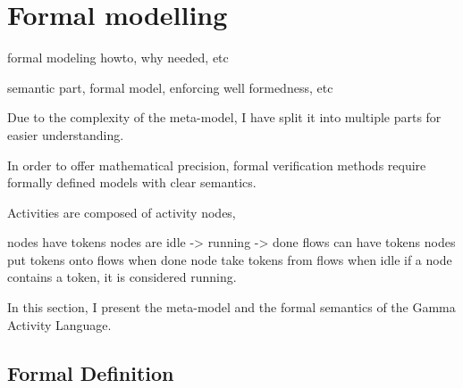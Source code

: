 \clearpage\section{Formal modelling}


formal modeling howto, why needed, etc

semantic part, formal model, enforcing well formedness, etc

Due to the complexity of the meta-model, I have split it into multiple parts for easier understanding.


In order to offer mathematical precision, formal verification methods require formally defined models with clear semantics. 

Activities are composed of activity nodes, 

nodes have tokens
nodes are idle -> running -> done
flows can have tokens
nodes put tokens onto flows when done
node take tokens from flows when idle
if a node contains a token, it is considered running.

In this section, I present the meta-model and the formal semantics of the Gamma Activity Language.

\subsection{Formal Definition}

